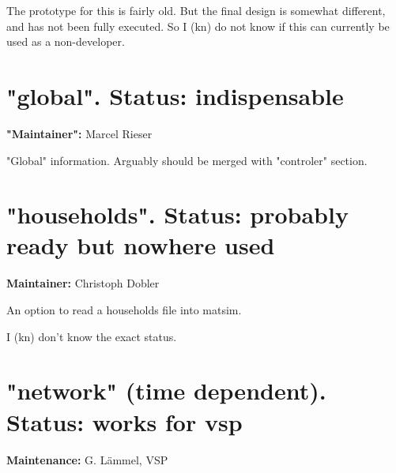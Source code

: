 The prototype for this is fairly old. But the final design is  somewhat different, and has not been fully executed. So I (kn) do  not know if this can currently be used as a non-developer.

\vfill\eject
\section{"global". Status: indispensable}

\textbf{"Maintainer":} Marcel Rieser

"Global" information. Arguably should be merged with "controler" section.

\vfill\eject
\section{"households". Status: probably ready but nowhere used}

\textbf{Maintainer:} Christoph Dobler

An option to read a households file into matsim.

I (kn) don't know the exact status.

\vfill\eject
\section{"network" (time dependent). Status: works for vsp}

\textbf{Maintenance:} G. Lämmel, VSP

